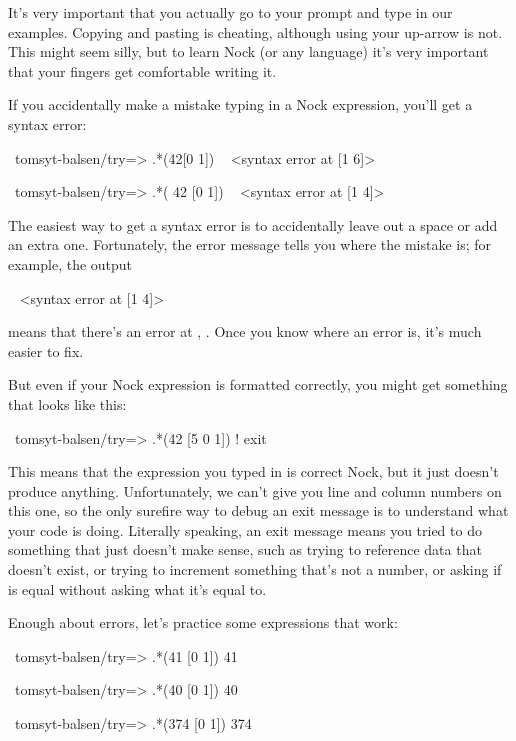 It's very important that you actually go to your prompt and type in our
examples. Copying and pasting is cheating, although using your up-arrow is not. This might seem silly, but to learn
Nock (or any language)  it's very important that your fingers get
comfortable writing it. 

If you accidentally make a mistake typing in a Nock expression, you'll get a
syntax error:

\begin{code}
~tomsyt-balsen/try=> .*(42[0 1])
~ <syntax error at [1 6]>

~tomsyt-balsen/try=> .*( 42 [0 1])
~ <syntax error at [1 4]>
\end{code}

The easiest way to get a syntax error is to accidentally leave out a space or add
an extra one. Fortunately, the error message tells you where the mistake is; for example, the output

\begin{code}
~ <syntax error at [1 4]>
\end{code}
means that there's an error at , .  Once you know where an
error is, it's much easier to fix.

But even if your Nock expression is formatted correctly, you might get
something that looks like this:

\begin{code}
~tomsyt-balsen/try=> .*(42 [5 0 1])
! exit
\end{code}
This means that the expression you typed in is correct Nock, but it just
doesn't produce anything. Unfortunately, we can't give you line and column
numbers on this one, so the only surefire way to debug an exit message is to
understand what your code is doing. Literally speaking, an exit message means
you tried to do something that just doesn't make sense, such as trying to
reference data that doesn't exist, or trying to increment something that's not
a number, or asking if  is equal without asking what it's equal to.

Enough about errors, let's practice some expressions that work:

\begin{code}
~tomsyt-balsen/try=> .*(41 [0 1])
41

~tomsyt-balsen/try=> .*(40 [0 1])
40

~tomsyt-balsen/try=> .*(374 [0 1])
374
\end{code}

